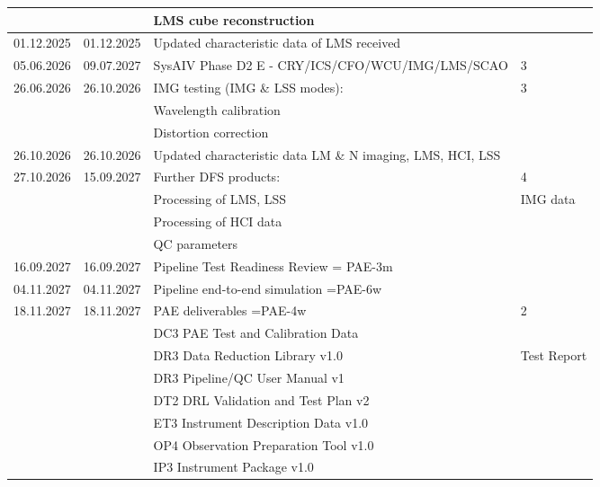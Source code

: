 \begin{table}
\begin{tabularx}{\textwidth}{llll}
    &          & LMS cube reconstruction                                      &	\\
\hline
01.12.2025 & 01.12.2025 & 	Updated characteristic data of LMS received		  &   \\
05.06.2026 & 09.07.2027 &	SysAIV Phase D2 E - CRY/ICS/CFO/WCU/IMG/LMS/SCAO            &   3 \\
26.06.2026 & 26.10.2026 &	IMG testing (IMG \& LSS modes):                   &	3 \\
   &           & Wavelength calibration        	                           & \\   
   &           & Distortion correction                                        & \\
\hline
26.10.2026 & 26.10.2026 & Updated characteristic data LM \& N imaging, LMS, HCI, LSS      & 	\\
\hline
27.10.2026 & 15.09.2027 &	Further DFS products:		                      &	4 \\
    &          &  Processing of LMS, LSS & IMG data                           &	\\
    &          &  Processing of HCI data                                      &	\\
    &          &    QC parameters					            &	\\
\hline
16.09.2027 & 16.09.2027 &	Pipeline Test Readiness Review = PAE-3m			  &	\\
\hline
04.11.2027 & 04.11.2027 &	Pipeline end-to-end simulation  =PAE-6w			  &	\\
\hline
18.11.2027 & 18.11.2027 &	PAE deliverables =PAE-4w                                    &	2 \\
           &               &	DC3 PAE Test and Calibration Data                           &	\\
           &               &	DR3 Data Reduction Library v1.0 & Test Report               &	\\
           &               &	DR3 Pipeline/QC User Manual v1                              &	\\
           &	     	   &    DT2 DRL Validation and Test Plan v2                         &	\\
           &      	   &	ET3 Instrument Description Data v1.0                        &	\\
           &   		   &	OP4 Observation Preparation Tool v1.0                       &	\\
           &	   	   &	IP3 Instrument Package v1.0				    &	\\

\end{tabularx}
\end{table}

